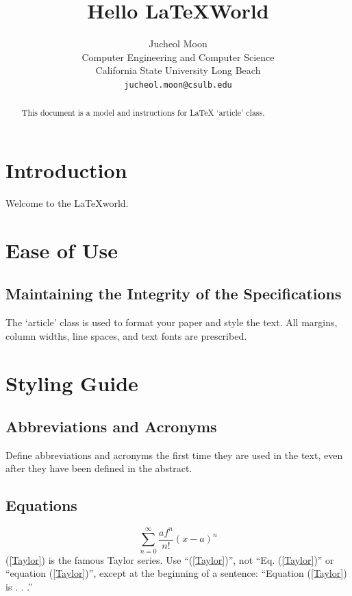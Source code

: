 \documentclass{article}
\begin{document}
\title{Hello \LaTeX \text{ }World}
\date{}
\author{\Large{Jucheol Moon}\\
Computer Engineering and Computer Science\\California State University Long Beach\\\texttt{jucheol.moon@csulb.edu\\}}
\maketitle




\begin{abstract}
This document is a model and instructions for \LaTeX \text{ } `article' class. 
\end{abstract}

\section{Introduction}
Welcome to the \LaTeX world.

\section{Ease of Use}

\subsection{Maintaining the Integrity of the Specifications}
The `article' class is used to format your paper and style the text. All margins, column widths, line spaces, and text fonts are prescribed.

\section{Styling Guide}

\subsection{Abbreviations and Acronyms}
Define abbreviations and acronyms the first time they are used in the text, 
even after they have been defined in the abstract.

\subsection{Equations}
\begin{equation}
\sum_{n=0}^{\infty}\frac{af^n}{n!}(x-a)^n
\label{Taylor}
\end{equation}
(\ref{Taylor}) is the famous Taylor series. Use ``(\ref{Taylor})'', not ``Eq. (\ref{Taylor})'' or ``equation (\ref{Taylor})'', except at the beginning of a sentence: ``Equation (\ref{Taylor}) is . . .''
\end{document}
